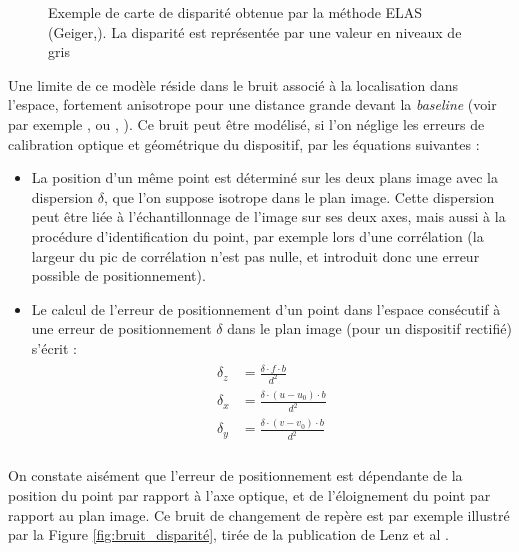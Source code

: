 \begin{figure}[h]
\begin{center}
		\caption{Exemple de carte de disparité obtenue par la méthode ELAS (Geiger,\cite{Geiger}). La disparité est représentée par une valeur en niveaux de gris}	
		 \label{fig:ch2_disparity_map}
	\end{center}
\end{figure}

Une limite de ce modèle réside dans le bruit associé à la localisation dans l'espace, fortement anisotrope pour une distance grande devant la \textit{baseline} (voir par exemple \cite{Blostein1987}, \cite{Demirdjian2001} ou \cite{Sibley2007}, \cite{Lenz2011}). Ce bruit peut être modélisé, si l'on néglige les erreurs de calibration optique et géométrique du dispositif, par les équations suivantes : 

\begin{itemize}
	\item La position d'un même point est déterminé sur les deux plans image avec la dispersion $\delta$, que l'on suppose isotrope dans le plan image. Cette dispersion peut être liée à l'échantillonnage de l'image sur ses deux axes, mais aussi à la procédure d'identification du point, par exemple lors d'une corrélation (la largeur du pic de corrélation n'est pas nulle, et introduit donc une erreur possible de positionnement).\\
	
	\item Le calcul de l'erreur de positionnement d'un point dans l'espace consécutif à une erreur de positionnement $\delta$ dans le plan image (pour un dispositif rectifié) s'écrit :
	\begin{align}
		\begin{split}
			\delta_z &= \frac{\delta \cdot f \cdot b}{d^2} \\
			\delta_x &= \frac{\delta \cdot (u - u_0) \cdot b}{d^2} \\
			\delta_y &= \frac{\delta \cdot (v - v_0) \cdot b}{d^2} \\
		\end{split}
	\end{align}
\end{itemize}

On constate aisément que l'erreur de positionnement est dépendante de la position du point par rapport à l'axe optique, et de l'éloignement du point par rapport au plan image. Ce bruit de changement de repère est par exemple illustré par la Figure \ref{fig:bruit_disparité}, tirée de la publication de Lenz et al \cite{Lenz2011}.

